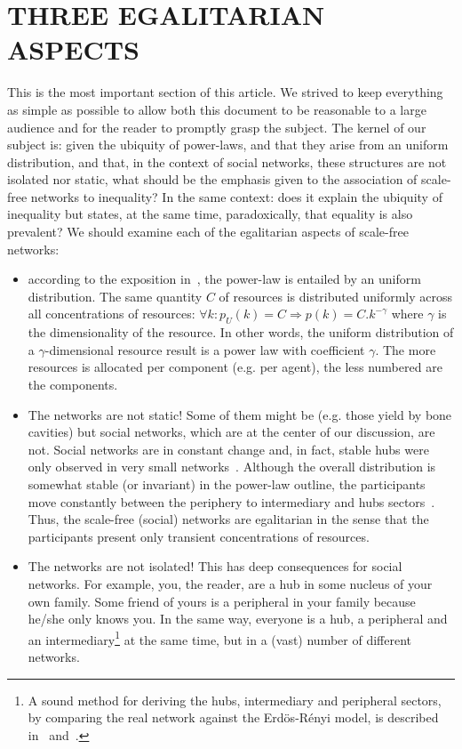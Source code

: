 \documentclass[12pt,fleqn]{article}
\begin{document}
\section{THREE EGALITARIAN ASPECTS}\label{sec:three}
This is the most important section of this article.
We strived to keep everything as simple as possible to allow
both this document to be reasonable to a large audience
and for the reader to promptly grasp the subject.
The kernel of our subject is: given the ubiquity of power-laws,
and that they arise from an uniform distribution,
and that, in the context of social networks, these structures
are not isolated nor static,
what should be the emphasis given to the association of scale-free
networks to inequality?
In the same context: does it explain the ubiquity of inequality
but states, at the same time, paradoxically, that equality is also prevalent?
We should examine each of the egalitarian aspects of scale-free networks:
\begin{itemize}
	\item according to the exposition in~\cite{fabbri3}, 
		the power-law is entailed by an uniform distribution.
		The same quantity $C$ of resources
		is distributed uniformly across all concentrations of resources:
		$\forall k : p_U(k)=C \Rightarrow p(k) = C.k^{-\gamma}$
		where $\gamma$ is the dimensionality of the resource.
                In other words, the uniform distribution of a $\gamma$-dimensional
		resource result is a power law with coefficient $\gamma$.
		The more resources is allocated per component (e.g. per agent), the less numbered
		are the components.
	\item The networks are not static!
		Some of them might be (e.g. those yield by bone cavities)
		but social networks, which are at the center of our discussion, are not.
		Social networks are in constant change and, in fact, stable hubs were only observed
		in very small networks~\citep{barabasi}.
		Although the overall distribution is somewhat stable (or invariant) in the power-law outline,
		the participants move constantly between the periphery to intermediary and hubs sectors~\cite{fabbri1,fabbri2,versinus}.
		Thus, the scale-free (social) networks are egalitarian in the sense that
		the participants present only transient concentrations of resources.
	\item The networks are not isolated!
		This has deep consequences for social networks.
		For example, you, the reader, are a hub in some nucleus of your own family.
		Some friend of yours is a peripheral in your family because he/she only knows you.
		In the same way, everyone is a hub, a peripheral and an intermediary\footnote{A
		sound method for deriving the hubs, intermediary and peripheral sectors,
		by comparing the real network against the Erdös-Rényi model, is described
		in~\cite{fabbri1} and~\cite{fabbri2}.} at the same time,
		but in a (vast) number of different networks.
\end{itemize}
\end{document}
